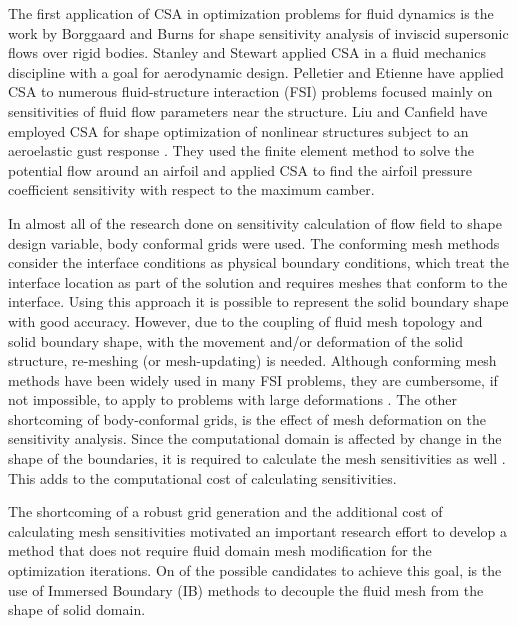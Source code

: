 The first application of CSA in optimization problems for fluid dynamics is the work by Borggaard and Burns \cite{borggaard1995sensitivity} for shape sensitivity analysis of inviscid supersonic flows over rigid bodies. Stanley and Stewart \cite{stanley2002design} applied CSA in a fluid mechanics discipline with a goal for aerodynamic design. Pelletier and Etienne have applied CSA to numerous fluid-structure interaction (FSI) problems \cite{etienne2005general} focused mainly on sensitivities of fluid flow parameters near the structure. Liu and Canfield have employed CSA for shape optimization of nonlinear structures subject to an aeroelastic gust response \cite{liu2013equivalence}. They used the finite element method to solve the potential flow around an airfoil and applied CSA to find the airfoil pressure coefficient sensitivity with respect to the maximum camber. 

In almost all of the research done on sensitivity calculation of flow field to shape design variable, body conformal grids were used. The conforming mesh methods consider the interface conditions as physical boundary conditions, which treat the interface location as part of the solution and requires meshes that conform to the interface. Using this approach it is possible to represent the solid boundary shape with good accuracy. However, due to the coupling of fluid mesh topology and solid boundary shape, with the movement and/or deformation of the solid structure, re-meshing (or mesh-updating) is needed. Although conforming mesh methods have been widely used in many FSI problems, they are cumbersome, if not impossible, to apply to problems with large deformations \cite{sahin2009arbitrary}. The other shortcoming of body-conformal grids, is the effect of mesh deformation on the sensitivity analysis. Since the computational domain is affected by change in the shape of the boundaries, it is required to calculate the mesh sensitivities as well \cite{liu2013boundary}. This adds to the computational cost of calculating  sensitivities.

The shortcoming of a robust grid generation and the additional cost of calculating mesh sensitivities motivated an important research effort to develop a method that does not require fluid domain mesh modification for the optimization iterations. On of the possible candidates to achieve this goal, is the use of Immersed Boundary (IB) methods to decouple the fluid mesh from the shape of solid domain.
